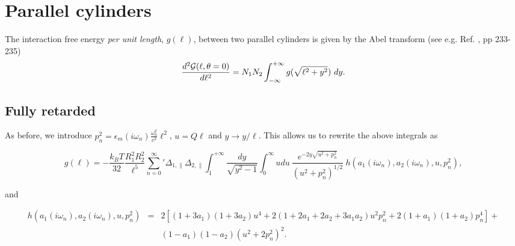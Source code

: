 \documentclass[onecolumn,letterpaper,amsmath,amssymb,floatfix,aps,superscriptaddress]{revtex4}
\begin{document}
\section{Parallel cylinders}

The interaction free energy {\sl per unit length}, $g(\ell)$, between two parallel cylinders is given by the Abel transform (see e.g. Ref. , pp 233-235)
\begin{equation}
\frac{d^{2}{\cal G}(\ell,\theta=0)}{d\ell^{2}}=N_1 N_2\int_{-\infty}^{+\infty}g(\sqrt{\ell^{2}+y^{2}})~dy.
\label{form2}
\end{equation}

\subsection{Fully retarded}

As before, we introduce $p_n^{2} =  \epsilon_m(i \omega_n) \frac{\omega_n^{2}}{c^{2}} \ell^{2}$, $u = Q\ell$ and $y \longrightarrow y/\ell$. This allows us to rewrite the above integrals as
\begin{widetext}
\begin{equation}
g(\ell) = - \frac{k_BT}{32} \frac{R_1^{2} R_2^{2}}{\ell^5} {\sum_{n=0}^{\infty}}' \Delta_{1,\parallel} \Delta_{2,\parallel} 
\int_{1}^{+\infty}\!\!\!\!\! \frac{dy}{\sqrt{y^2 - 1}} \int_0^{\infty}\!\!\!  u du ~\frac{e^{-2 y \sqrt{u^{2} + p_n^{2}}}}{(u^{2} +p_n^{2})^{1/2}} ~h(a_1(i \omega_n), a_2(i \omega_n), u, p_n^{2}),
\label{retardedfinal}
\end{equation}
\end{widetext}
and
\begin{widetext}
\begin{eqnarray}
h(a_1(i \omega_n), a_2(i \omega_n), u, p_n^{2}) &=&   2 \left[ (1+3a_1)(1+3a_2) u^{4} + 2 (1+2a_1+2a_2+3a_1a_2) u^{2} p_n^{2} + 2(1+a_1)(1+a_2) p_n^{4}\right]  + \nonumber \\
& &  (1-a_1) (1-a_2) (u^{2} + 2 p_n^{2})^2 .
\label{fcfenhjqwk}
\end{eqnarray}
\end{widetext}
\end{document}
